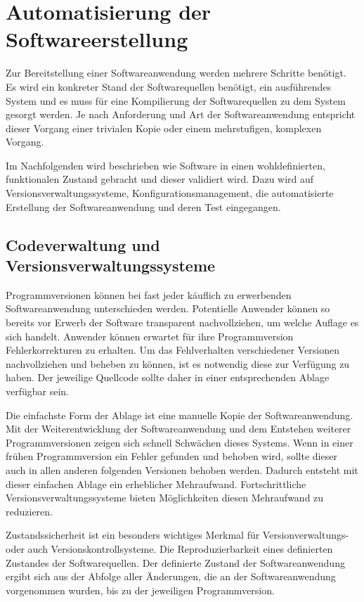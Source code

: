 \section{Automatisierung der Softwareerstellung}
\label{sec:automation-software}

Zur Bereitstellung einer Softwareanwendung werden mehrere Schritte benötigt. Es wird ein konkreter Stand der Softwarequellen benötigt, ein ausführendes System und es muss für eine Kompilierung der Softwarequellen zu dem System gesorgt werden.
Je nach Anforderung und Art der Softwareanwendung entspricht dieser Vorgang einer trivialen Kopie oder einem mehrstufigen, komplexen Vorgang. 

Im Nachfolgenden wird beschrieben wie Software in einen wohldefinierten, funktionalen Zustand gebracht und dieser validiert wird. Dazu wird auf Versionsverwaltungssysteme, Konfigurationsmanagement, die automatisierte Erstellung der Softwareanwendung und deren Test eingegangen.

\subsection{Codeverwaltung und Versionsverwaltungssysteme}

Programmversionen können bei fast jeder käuflich zu erwerbenden Softwareanwendung unterschieden werden. Potentielle 
Anwender können so bereits vor Erwerb der Software transparent nachvollziehen, um welche Auflage es sich handelt. Anwender können erwartet für ihre Programmversion Fehlerkorrekturen zu erhalten. Um das Fehlverhalten verschiedener Versionen nachvollziehen und beheben zu können, ist es notwendig diese zur Verfügung zu haben. Der jeweilige Quellcode sollte daher in einer entsprechenden Ablage verfügbar sein.

Die einfachste Form der Ablage ist eine manuelle Kopie der Softwareanwendung. Mit der Weiterentwicklung der Softwareanwendung und
dem Entstehen weiterer Programmversionen zeigen sich schnell Schwächen dieses Systems. Wenn in einer frühen 
Programmversion ein Fehler gefunden und behoben wird, sollte dieser auch in allen anderen folgenden Versionen behoben 
werden. Dadurch entsteht mit dieser einfachen Ablage ein erheblicher Mehraufwand. Fortschrittliche 
Versionsverwaltungssysteme bieten Möglichkeiten diesen Mehraufwand zu reduzieren.

Zustandssicherheit ist ein besonders wichtiges Merkmal für Versionverwaltungs- oder auch Versionskontrollsysteme.
Die Reproduzierbarkeit eines definierten Zustandes der Softwarequellen. Der definierte Zustand der Softwareanwendung ergibt sich
aus der Abfolge aller Änderungen, die an der Softwareanwendung vorgenommen wurden, bis zu der jeweiligen Programmversion. 

